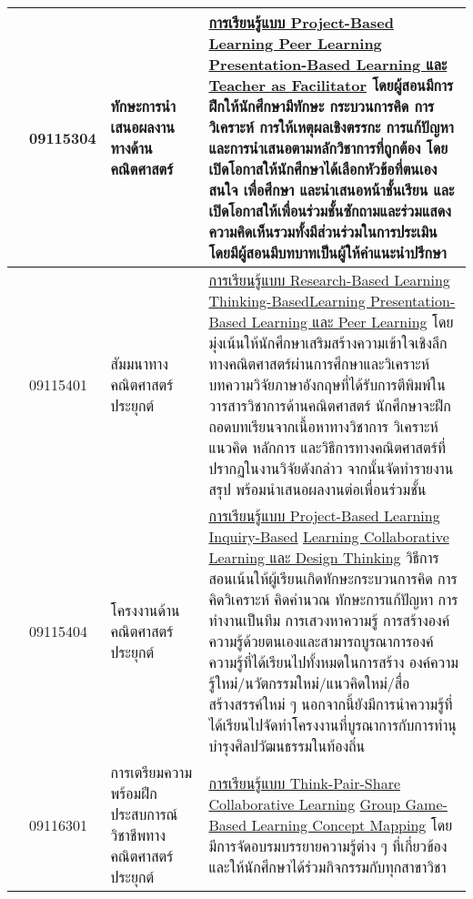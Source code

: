 {\begin{center}
\begin{longtable}{|p{}|p{}|p{}|>{\raggedcolumns}p{}|}
	\\   	
	\cline{2-4}
	& 09115304 &ทักษะการนำเสนอผลงานทางด้านคณิตศาสตร์ &
	\underline{การเรียนรู้แบบ Project-Based Learning Peer Learning}\newline\underline{ Presentation-Based Learning และ Teacher as}\newline \underline{ Facilitator} โดยผู้สอนมีการฝึกให้นักศึกษามีทักษะ กระบวนการคิด การวิเคราะห์ การให้เหตุผลเชิงตรรกะ การแก้ปัญหา และการนำเสนอตามหลักวิชาการที่ถูกต้อง โดยเปิดโอกาสให้นักศึกษาได้เลือกหัวข้อที่ตนเองสนใจ เพื่อศึกษา และนำเสนอหน้าชั้นเรียน และเปิดโอกาสให้เพื่อนร่วมชั้นซักถามและร่วมแสดงความคิดเห็นรวมทั้งมีส่วนร่วมในการประเมิน โดยมีผู้สอนมีบทบาทเป็นผู้ให้คำแนะนำปรึกษา
	\\ \hline
	& 09115401 &สัมมนาทางคณิตศาสตร์ประยุกต์ &
	\underline{การเรียนรู้แบบ Research-Based Learning Thinking-Based}\newline \underline{Learning Presentation-Based Learning และ Peer}\newline  \underline{ Learning} โดยมุ่งเน้นให้นักศึกษาเสริมสร้างความเข้าใจเชิงลึกทางคณิตศาสตร์ผ่านการศึกษาและวิเคราะห์บทความวิจัยภาษาอังกฤษที่ได้รับการตีพิมพ์ในวารสารวิชาการด้านคณิตศาสตร์ นักศึกษาจะฝึกถอดบทเรียนจากเนื้อหาทางวิชาการ วิเคราะห์แนวคิด หลักการ และวิธีการทางคณิตศาสตร์ที่ปรากฏในงานวิจัยดังกล่าว จากนั้นจัดทำรายงานสรุป พร้อมนำเสนอผลงานต่อเพื่อนร่วมชั้น 
	\\
	\cline{2-4}
	& 09115404 & โครงงานด้านคณิตศาสตร์ประยุกต์ &\underline{
	การเรียนรู้แบบ  Project-Based Learning Inquiry-Based} \underline{Learning Collaborative Learning และ Design Thinking} วิธีการสอนเน้นให้ผู้เรียนเกิดทักษะกระบวนการคิด การคิดวิเคราะห์ คิดคำนวณ ทักษะการแก้ปัญหา การทำงานเป็นทีม การเสวงหาความรู้ การสร้างองค์ความรู้ด้วยตนเองและสามารถบูรณาการองค์ความรู้ที่ได้เรียนไปทั้งหมดในการสร้าง องค์ความรู้ใหม่/นวัตกรรมใหม่/แนวคิดใหม่/สื่อสร้างสรรค์ใหม่ ๆ นอกจากนี้ยังมีการนำความรู้ที่ได้เรียนไปจัดทำโครงงานที่บูรณาการกับการทำนุบำรุงศิลปวัฒนธรรมในท้องถิ่น   
		\\  
	\cline{2-4}
	& 09116301 & การเตรียมความพร้อมฝึกประสบการณ์วิชาชีพทางคณิตศาสตร์ประยุกต์ &
	\underline{การเรียนรู้แบบ  Think-Pair-Share Collaborative Learning} \underline{Group Game-Based Learning Concept Mapping}  โดยมีการจัดอบรมบรรยายความรู้ต่าง ๆ ที่เกี่ยวข้องและให้นักศึกษาได้ร่วมกิจกรรมกับทุกสาขาวิชา  
	\\  
	
	\hline
	
\end{longtable}
\end{center}



}
